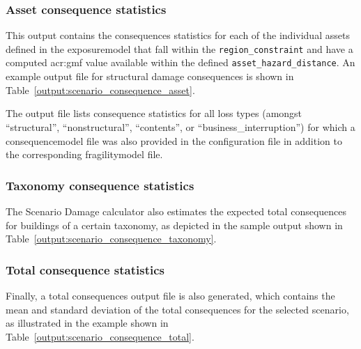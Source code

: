 \subsubsection{Asset consequence statistics}
\label{subsubsec:scenario_asset_consequence_statistics}

This output contains the consequences statistics for each of the individual
\glspl{asset} defined in the \gls{exposuremodel} that fall within the
\Verb+region_constraint+ and have a computed \gls{acr:gmf} value available
within the defined \Verb+asset_hazard_distance+. An example output file for
structural damage consequences is shown in
Table~\ref{output:scenario_consequence_asset}.



The output file lists consequence statistics for all loss types (amongst
``structural'', ``nonstructural'', ``contents'', or
``business\_interruption'') for which a \gls{consequencemodel} file was also
provided in the configuration file in addition to the corresponding
\gls{fragilitymodel} file.


\subsubsection{Taxonomy consequence statistics}
\label{subsubsec:scenario_taxonomy_consequence_statistics}

The Scenario Damage calculator also estimates the expected total consequences
for buildings of a certain \gls{taxonomy}, as depicted in the sample output
shown in Table~\ref{output:scenario_consequence_taxonomy}.




\subsubsection{Total consequence statistics}
\label{subsubsec:scenario_total_consequence_statistics}

Finally, a total consequences output file is also generated, which contains
the mean and standard deviation of the total consequences for the selected
scenario, as illustrated in the example shown in
Table~\ref{output:scenario_consequence_total}.

